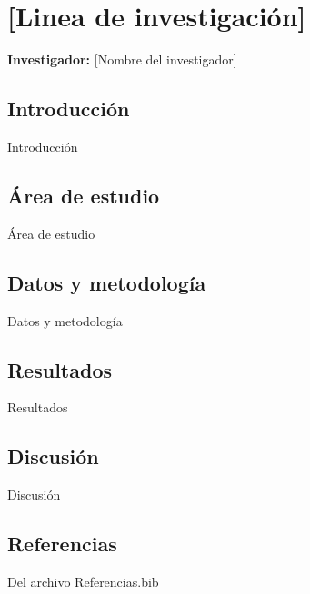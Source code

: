 \restoregeometry




\chapter*{\textsf{[Linea de investigación]}}

\textbf{Investigador:} [Nombre del investigador]


\section{\textsf{Introducción}}

Introducción

\section{\textsf{Área de estudio}}

Área de estudio

\section{\textsf{Datos y metodología}}

Datos y metodología

\section{\textsf{Resultados}}

Resultados

\section{\textsf{Discusión}}

Discusión

\section{\textsf{Referencias}}
\renewcommand{\bibsection}{}



Del archivo Referencias.bib